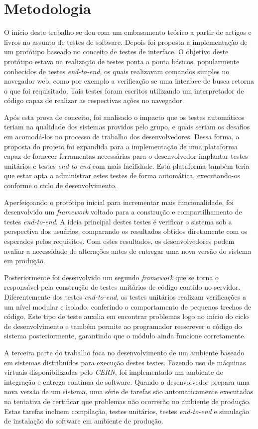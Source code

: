 \section{Metodologia}
 O início deste trabalho se deu com um embasamento teórico a partir de artigos e livros no assunto de testes de software. Depois foi proposta a implementação de um protótipo baseado no conceito de testes de interface. O objetivo deste protótipo estava na realização de testes ponta a ponta básicos, popularmente conhecidos de testes \emph{end-to-end}, os quais realizavam comandos simples no navegador web, como por exemplo a verificação se uma interface de busca retorna o que foi requisitado. Tais testes foram escritos utilizando um interpretador de código capaz de realizar as respectivas ações no navegador.

 Após esta prova de conceito, foi analisado o impacto que os testes automáticos teriam na qualidade dos sistemas providos pelo grupo, e quais seriam os desafios em acomodá-los no processo de trabalho dos desenvolvedores. Dessa forma, a proposta do projeto foi expandida para a implementação de uma plataforma capaz de fornecer ferramentas necessárias para o desenvolvedor implantar testes unitários e testes \emph{end-to-end} com mais facilidade. Esta plataforma também teria que estar apta a administrar estes testes de forma automática, executando-os conforme o ciclo de desenvolvimento.

Aperfeiçoando o protótipo inicial para incrementar mais funcionalidade, foi desenvolvido um \emph{framework} voltado para a construção e compartilhamento de testes \emph{end-to-end}. A ideia principal destes testes é verificar o sistema sob a perspectiva dos usuários, comparando os resultados obtidos diretamente com os esperados pelos requisitos. Com estes resultados, os desenvolvedores podem avaliar a necessidade de alterações antes de entregar uma nova versão do sistema em produção.

Posteriormente foi desenvolvido um segundo \emph{framework} que se torna o responsável pela construção de testes unitários de código contido no servidor. Diferentemente dos testes \emph{end-to-end}, os testes unitários realizam verificações a um nível modular e isolado, conferindo o comportamento de pequenos trechos de código. Este tipo de teste auxilia em encontrar problemas logo no início do ciclo de desenvolvimento e também permite ao programador reescrever o código do sistema posteriormente, garantindo que o módulo ainda funcione corretamente.

A terceira parte do trabalho foca no desenvolvimento de um ambiente baseado em sistemas distribuídos para execução destes testes. Fazendo uso de máquinas virtuais disponibilizadas pelo \emph{CERN}, foi implementado um ambiente de integração e entrega contínua de software. Quando o desenvolvedor prepara uma nova versão de um sistema, uma série de tarefas são automaticamente executadas na tentativa de certificar que problemas não ocorrerão no ambiente de produção. Estas tarefas incluem compilação, testes unitários, testes \emph{end-to-end} e simulação de instalação do software em ambiente de produção.

